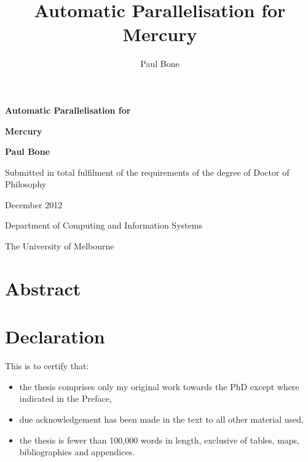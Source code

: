 \documentclass[a4paper,twoside,openright]{report}
\title{Automatic Parallelisation for Mercury}
\author{Paul Bone}
\begin{document}


\begin{titlepage}
\begin{center}
\vspace*{3cm}
{\Huge \textbf{Automatic Parallelisation for}} \par
\vspace*{1em}
{\Huge \textbf{Mercury}} \par
\vspace*{2cm}
{\huge \textbf{Paul Bone}} \par
\vspace*{4cm}
{\Large Submitted in total fulfilment of the requirements of the degree of
        Doctor of Philosophy} \par
\vspace*{1cm}
{\Large December 2012} \par
\vspace*{1cm}
{\Large Department of Computing and Information Systems} \par
{\Large The University of Melbourne} \par
\end{center}

\end{titlepage}

\thispagestyle{empty}

\chapter*{Abstract}

\setcounter{page}{1}




\chapter*{Declaration}


This is to certify that:

\begin{itemize}

    \item the thesis comprises only my original work towards the PhD except
          where indicated in the Preface,

    \item due acknowledgement has been made in the text to all other material
          used,

    \item the thesis is fewer than 100,000 words in length, exclusive of
          tables, maps, bibliographies and appendices.

\end{itemize}
\end{document}
